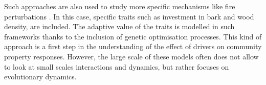 Such approaches are also used to study more specific mechanisms like fire perturbations \parencite{scheiter_next-generation_2013}. In this case, specific traits such as investment in bark and wood density, are included. The adaptive value of the traits is modelled in such frameworks thanks to the inclusion of genetic optimisation processes. This kind of approach is a first step in the understanding of the effect of drivers on community property responses. However, the large scale of these models often does not allow to look at small scales interactions and dynamics, but rather focuses on evolutionary dynamics.


%
% 
